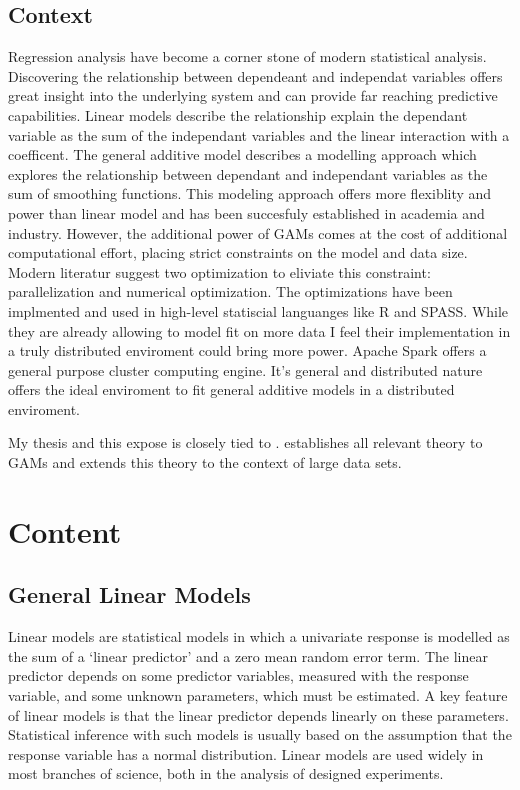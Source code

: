 \documentclass{article}
\begin{document}
    \subsection{Context}
    Regression analysis have become a corner stone of modern statistical analysis. Discovering the relationship between dependeant and independat variables offers great insight into the underlying system and can provide far reaching predictive capabilities. Linear models describe the relationship explain the dependant variable as the sum of the independant variables and the linear interaction with a coefficent. The general additive model describes a modelling approach which explores the relationship between dependant and independant variables as the sum of smoothing functions. This modeling approach offers more flexiblity and power than linear model and has been succesfuly established in academia and industry. However, the additional power of GAMs comes at the cost of additional computational effort, placing strict constraints on the model and data size. Modern literatur suggest two optimization to eliviate this constraint: parallelization and numerical optimization.
    The optimizations have been implmented and used in high-level statiscial languanges like R and SPASS. While they are already allowing to model fit on more data I feel their implementation in a truly distributed enviroment could bring more power. Apache Spark offers a general purpose cluster computing engine. It's general and distributed nature offers the ideal enviroment to fit general additive models in a distributed enviroment.

    My thesis and this expose is closely tied to \cite{gamBook}. \cite{gamBook} establishes all relevant theory to GAMs and \cite{bigdataGAM} extends this theory to the context of large data sets.


    \section{Content}
    \subsection{General Linear Models}
    Linear models are statistical models in which a univariate response is modelled as the sum of a ‘linear predictor’ and a zero mean random error term. The linear predictor depends on some predictor variables, measured with the response variable, and some unknown parameters, which must be estimated. A key feature of linear models is that the linear predictor depends linearly on these parameters. Statistical inference with such models is usually based on the assumption that the response variable has a normal distribution. Linear models are used widely in most branches of science, both in the analysis of designed experiments. \
\end{document}
